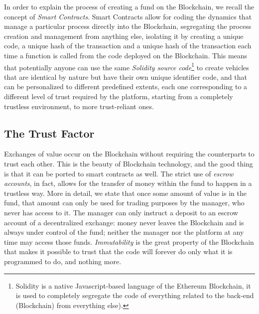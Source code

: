 \documentclass[9pt,oneside]{amsart}
\begin{document}
\begin{multicols}{2}
In order to explain the process of creating a fund on the Blockchain, we recall the concept of \textit{Smart Contracts}. Smart Contracts allow for coding the dynamics that manage a particular process directly into the Blockchain, segregating the process creation and management from anything else, isolating it by creating a unique code, a unique hash of the transaction and a unique hash of the transaction each time a function is called from the code deployed on the Blockchain. This means that potentially anyone can use the same \textit{Solidity source code}\footnote{Solidity is a native Javascript-based language of the Ethereum Blockchain, it is used to completely segregate the code of everything related to the back-end (Blockchain) from everything else).} to create vehicles that are identical by nature but have their own unique identifier code, and that can be personalized to different predefined extents, each one corresponding to a different level of trust required by the platform, starting from a completely trustless environment, to more trust-reliant ones.

\subsection{The Trust Factor} \label{ch:transaction}

Exchanges of value occur on the Blockchain without requiring the counterparts to trust each other. This is the beauty of Blockchain technology, and the good thing is that it can be ported to smart contracts as well. The strict use of \textit{escrow accounts}, in fact, allows for the transfer of money within the fund to happen in a trustless way.
More in detail, we state that once some amount of value is in the fund, that amount can only be used for trading purposes by the manager, who never has access to it. The manager can only instruct a deposit to an escrow account of a decentralized exchange: money never leaves the Blockchain and is always under control of the fund; neither the manager nor the platform at any time may access those funds. \textit{Immutability} is the great property of the Blockchain that makes it possible to trust that the code will forever do only what it is programmed to do, and nothing more.


\end{multicols}
\end{document}
